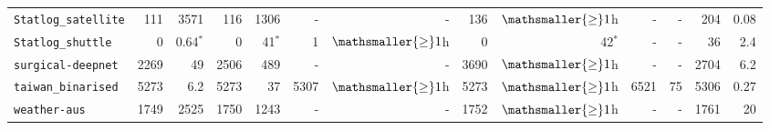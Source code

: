 \begin{tabular}{lrrrrrrrrrrrr}
\texttt{Statlog\_satellite} & 111 & 3571 & 116 & 1306 & - & - & 136 & $\mathsmaller{\geq}1$h & - & - & 204 & 0.08\\
\texttt{Statlog\_shuttle} & 0 & 0.64$^*$ & 0 & 41$^*$ & 1 & $\mathsmaller{\geq}1$h & 0 & 42$^*$ & - & - & 36 & 2.4\\
\texttt{surgical-deepnet} & 2269 & 49 & 2506 & 489 & - & - & 3690 & $\mathsmaller{\geq}1$h & - & - & 2704 & 6.2\\
\texttt{taiwan\_binarised} & 5273 & 6.2 & 5273 & 37 & 5307 & $\mathsmaller{\geq}1$h & 5273 & $\mathsmaller{\geq}1$h & 6521 & 75 & 5306 & 0.27\\
\texttt{weather-aus} & 1749 & 2525 & 1750 & 1243 & - & - & 1752 & $\mathsmaller{\geq}1$h & - & - & 1761 & 20\\
\bottomrule
\end{tabular}
